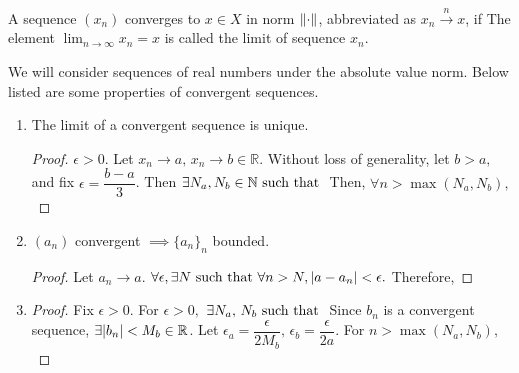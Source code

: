 \begin{definition}
    A sequence $(x_n)$ converges to $x\in X$ in norm $\norm{\cdot}$, abbreviated as $x_n\xrightarrow{n} x$, if
    The element $\lim_{n\rightarrow\infty}x_n=x$ is called the limit of sequence $x_n.$
\end{definition}


We will consider sequences of real numbers under the absolute value norm. Below listed are some properties of convergent sequences.

\begin{enumerate}
    \item The limit of a convergent sequence is unique.
    \begin{proof}
        $\epsilon>0$. Let $x_n\rightarrow a,\,x_n\rightarrow b\in\mathbb{R}$. Without loss of generality, let $b>a,$ and fix $\epsilon=\dfrac{b-a}{3}$. Then $\exists N_a,N_b\in\mathbb{N}\text{ such that }$
        Then, $\forall n>\max(N_a,N_b),$
    \end{proof}    
    
    \item $(a_n)$ convergent $\implies \{a_n\}_n$ bounded.
    \begin{proof}
        Let $a_n\rightarrow a.$ $\forall \epsilon, \exists N\text{ such that } \forall n>N,\abs{a-a_n}<\epsilon.$ Therefore,
    \end{proof}
    
    \item 
    \begin{proof}
       Fix $\epsilon>0$. For $\epsilon>0,$ $\exists N_a,\,N_b\text{ such that }$
       Since $b_n$ is a convergent sequence, $\exists \abs{b_n} < M_b\in\mathbb{R}$. Let $\epsilon_a=\dfrac{\epsilon}{2M_b},\,\epsilon_b=\dfrac{\epsilon}{2a}$. For $n>\max(N_a,N_b),$
    \end{proof}
    

\end{enumerate}

